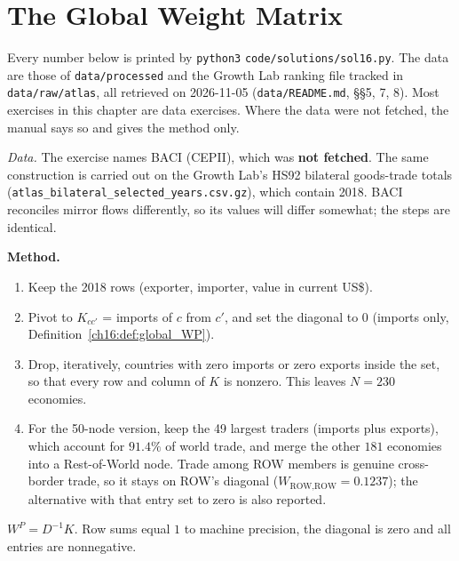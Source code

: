 \documentclass[../solutions_manual.tex]{subfiles}
\begin{document}
\begingroup\setlength{\emergencystretch}{3em}%
\ifSubfilesClassLoaded{\setcounter{chapter}{15}}{}%
\setcounter{chapter}{15}%
\chapter{The Global Weight Matrix}\label{sol16}

Every number below is printed by \texttt{python3} \nolinkurl{code/solutions/sol16.py}. The data are those of \nolinkurl{data/processed} and the Growth Lab ranking file tracked in \nolinkurl{data/raw/atlas}, all retrieved on 2026-11-05 (\nolinkurl{data/README.md}, \S\S5, 7, 8). Most exercises in this chapter are data exercises. Where the data were not fetched, the manual says so and gives the method only.


\emph{Data.} The exercise names BACI (CEPII), which was \textbf{not fetched}. The same construction is carried out on the Growth Lab's HS92 bilateral goods-trade totals \citep{growthlab2026atlas} (\nolinkurl{atlas_bilateral_selected_years.csv.gz}), which contain 2018. BACI reconciles mirror flows differently, so its values will differ somewhat; the steps are identical.

 \textbf{Method.}
\begin{enumerate}
\item Keep the 2018 rows (exporter, importer, value in current US\$).
\item Pivot to $K_{cc'}$ = imports of $c$ from $c'$, and set the diagonal to $0$ (imports only, Definition~\ref{ch16:def:global_WP}).
\item Drop, iteratively, countries with zero imports or zero exports inside the set, so that every row and column of $K$ is nonzero. This leaves $N = 230$ economies.
\item For the 50-node version, keep the 49 largest traders (imports plus exports), which account for $91.4\%$ of world trade, and merge the other $181$ economies into a Rest-of-World node. Trade among ROW members is genuine cross-border trade, so it stays on ROW's diagonal ($W_{\text{ROW,ROW}} = 0.1237$); the alternative with that entry set to zero is also reported.
\end{enumerate}

 $W^P = D^{-1}K$. Row sums equal $1$ to machine precision, the diagonal is zero and all entries are nonnegative.
\end{document}
